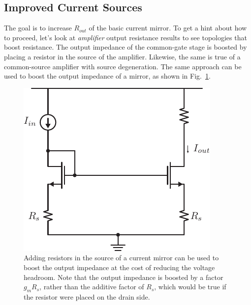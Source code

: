 \subsection{Improved Current Sources}
The goal is to increase $R_{out}$ of the basic current mirror.  To get a hint about how to proceed, let's look at \textit{amplifier} output resistance results to see topologies that boost resistance.  The output impedance of the common-gate stage is boosted by placing a resistor in the source of the amplifier.  Likewise, the same is true of a common-source amplifier with source degeneration.  The same approach can be used to boost the output impedance of a mirror, as shown in Fig.~\ref{fig:9mirror_Rs.pdf}.
\begin{figure}[tb]
\centering
\includegraphics[scale=1]{9mirror_Rs.pdf}
\caption{Adding resistors in the source of a current mirror can be used to boost the output impedance at the cost of reducing the voltage headroom.  Note that the output impedance is boosted by a factor $g_m R_s$, rather than the additive factor of $R_s$, which would be true if the resistor were placed on the drain side.}
\label{fig:9mirror_Rs.pdf}
\end{figure}
